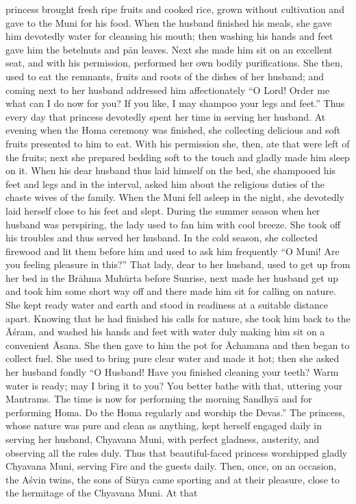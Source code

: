 princess brought fresh ripe fruits and cooked rice, grown without cultivation and gave to the Muni for his food. When the husband finished his meals, she gave him devotedly water for cleansing his mouth; then washing his hands and feet gave him the betelnuts and p\=an leaves. Next she made him sit on an excellent seat, and with his permission, performed her own bodily purifications. She then, used to eat the remnants, fruits and roots of the dishes of her husband; and coming next to her husband addressed him affectionately ``O Lord! Order me what can I do now for you? If you like, I may shampoo your legs and feet.'' Thus every day that princess devotedly spent her time in serving her husband. At evening when the Homa ceremony was finished, she collecting delicious and soft fruits presented to him to eat. With his permission she, then, ate that were left of the fruits; next she prepared bedding soft to the touch and gladly made him sleep on it. When his dear husband thus laid himself on the bed, she shampooed his feet and legs and in the interval, asked him about the religious duties of the chaste wives of the family. When the Muni fell asleep in the night, she devotedly laid herself close to his feet and slept. During the summer season when her husband was perspiring, the lady used to fan him with cool breeze. She took off his troubles and thus served her husband. In the cold season, she collected firewood and lit them before him and used to ask him frequently ``O Muni! Are you feeling pleasure in this?'' That lady, dear to her husband, used to get up from her bed in the Br\=ahma Muh\=urta before Sunrise, next made her husband get up and took him some short way off and there made him sit for calling on nature. She kept ready water and earth and stood in readiness at a suitable distance apart. Knowing that he had finished his calls for nature, she took him back to the \=A\'sram, and washed his hands and feet with water duly making him sit on a convenient \=Asana. She then gave to him the pot for \=Achamana and then began to collect fuel. She used to bring pure clear water and made it hot; then she asked her husband fondly ``O Husband! Have you finished cleaning your teeth? Warm water is ready; may I bring it to you? You better bathe with that, uttering your Mantrams. The time is now for performing the morning Sandhy\=a and for performing Homa. Do the Homa regularly and worship the Devas.'' The princess, whose nature was pure and clean as anything, kept herself engaged daily in serving her husband, Chyavana Muni, with perfect gladness, austerity, and observing all the rules duly. Thus that beautiful-faced princess worshipped gladly Chyavana Muni, serving Fire and the guests daily. Then, once, on an occasion, the A\'svin twins, the sons of S\=urya came sporting and at their pleasure, close to the hermitage of the Chyavana Muni. At that

